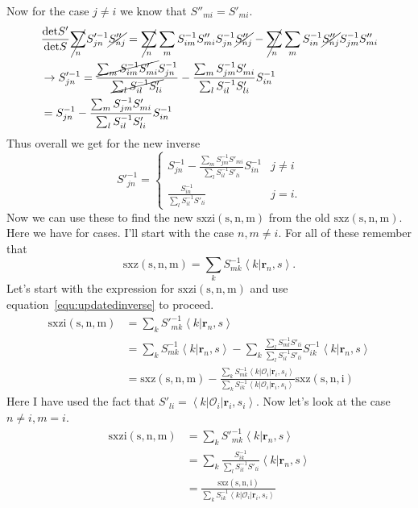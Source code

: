 \documentclass[12pt]{extarticle}
\newcommand{\Oi}{\mathcal{O}_{i}}
\newcommand{\ket}[1]{\left| #1 \right>}
\newcommand{\bra}[1]{\left< #1 \right|}
\newcommand{\braket}[2]{\left< #1 | #2 \right>}
\newcommand{\detr}{\mathrm{det}}
\begin{document}
Now for the case $j\neq i$ we know that $S''_{mi} = S'_{mi}$.
\begin{align}
  &\frac{\detr S'}{\detr S}\cancel{\sum_n} S'^{-1}_{jn}\cancel{S''_{nj}} = \cancel{\sum_n}\sum_m S^{-1}_{im}S''_{mi}S^{-1}_{jn}\cancel{S''_{nj}} - \cancel{\sum_n}\sum_m S^{-1}_{in}\cancel{S''_{nj}}S^{-1}_{jm}S''_{mi} \\
  &\rightarrow S'^{-1}_{jn} = \frac{\cancel{\sum_m S^{-1}_{im}S'_{mi}}S^{-1}_{jn}}{\cancel{\sum_l S^{-1}_{il}S'_{li}}} - \frac{\sum_m S^{-1}_{jm}S'_{mi}}{\sum_l S^{-1}_{il}S'_{li}}S^{-1}_{in} \\
  &= S^{-1}_{jn} - \frac{\sum_m S^{-1}_{jm}S'_{mi}}{\sum_l S^{-1}_{il}S'_{li}}S^{-1}_{in}
\end{align}
Thus overall we get for the new inverse
\begin{equation}
  S'^{-1}_{jn} = \begin{cases}
  S^{-1}_{jn} - \frac{\sum_m S^{-1}_{jm}S'_{mi}}{\sum_l S^{-1}_{il}S'_{li}}S^{-1}_{in} & j \neq i \\
  \frac{S^{-1}_{in}}{\sum\limits_l S^{-1}_{il}S'_{li}} & j = i.
  \end{cases}
  \label{equ:updatedinverse}
\end{equation}
Now we can use these to find the new $\mathrm{sxzi(s,n,m)}$ from the old $\mathrm{sxz(s,n,m)}$. Here we have for cases. I'll start with the case $n,m\neq i$.
For all of these remember that
\begin{equation}
  \mathrm{sxz(s,n,m)} = \sum_k S^{-1}_{mk} \braket{k}{\mathbf{r}_n,s}.
\end{equation}
Let's start with the expression for $\mathrm{sxzi(s,n,m)}$ and use equation~\ref{equ:updatedinverse} to proceed.
\begin{align}
  \mathrm{sxzi(s,n,m)} &= \sum_k S'^{-1}_{mk}\braket{k}{\mathbf{r}_n,s} \\
  &= \sum_kS^{-1}_{mk}\braket{k}{\mathbf{r}_n,s} - \sum_k \frac{\sum_l S^{-1}_{ml} S'_{li}}{\sum_l S^{-1}_{il} S'_{li}} S^{-1}_{ik}\braket{k}{\mathbf{r}_n,s} \\
  &= \mathrm{sxz(s,n,m)} - \frac{\sum_k S^{-1}_{mk}\bra{k}\Oi\ket{\mathbf{r}_i,s_i}}{\sum_k S^{-1}_{ik}\bra{k}\Oi\ket{\mathbf{r}_i,s_i}} \mathrm{sxz(s,n,i)}
\end{align}
Here I have used the fact that $S'_{li} = \bra{k}\Oi\ket{\mathbf{r}_i,s_i}$. Now let's look at the case $n\neq i, m=i$.
\begin{align}
  \mathrm{sxzi(s,n,m)} &= \sum_k S'^{-1}_{mk}\braket{k}{\mathbf{r}_n,s} \\
  &= \sum_k \frac{S^{-1}_{ik}}{\sum_l S^{-1}_{il}S'_{li}} \braket{k}{\mathbf{r}_n,s} \\
  &= \frac{\mathrm{sxz(s,n,i)}}{\sum_k S^{-1}_{ik} \bra{k}\Oi\ket{\mathbf{r}_i,s_i}}
\end{align}
\end{document}
